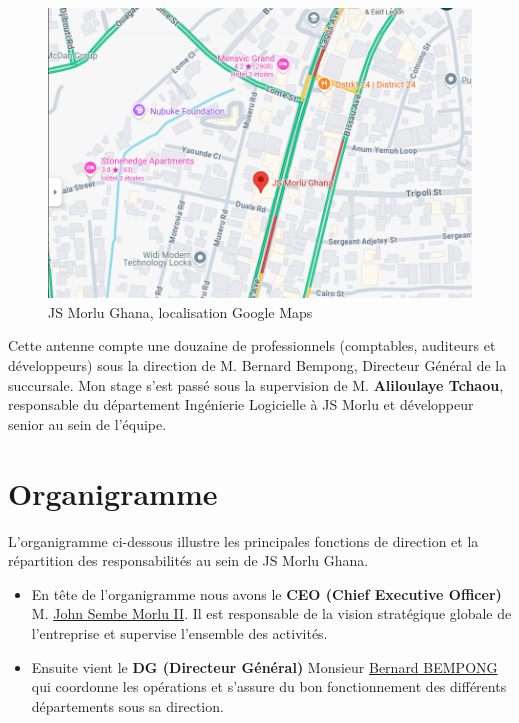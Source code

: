 {\begin{figure}[H]
\begin{center}
\includegraphics[width=15cm]{assets/presentation/jsmorlu-map.png}
\end{center}
\caption{JS Morlu Ghana, localisation Google Maps }
\end{figure}

\vspace{0.5cm}

Cette antenne compte une douzaine de professionnels (comptables, auditeurs et développeurs) sous la direction de M. Bernard Bempong, Directeur Général de la succursale. Mon stage s'est passé sous la supervision de M. \textbf{ Aliloulaye Tchaou}, responsable du département Ingénierie Logicielle à JS Morlu et développeur senior au sein de l'équipe.

\section{Organigramme}

L’organigramme ci-dessous illustre les principales fonctions de direction et la répartition des responsabilités au sein de JS Morlu Ghana.

\begin{itemize}
    \item En tête de l'organigramme nous avons le  \textbf{CEO (Chief Executive Officer)} M. \href{https://jsmorlu.com.gh/our-team/john-sembe-morlu-ii/}{John Sembe Morlu II}. Il est responsable de la vision stratégique globale de l’entreprise et supervise l’ensemble des activités.

    \item Ensuite vient le \textbf{DG (Directeur Général)} Monsieur \href{https://jsmorlu.com.gh/our-team/bernard-bempong/}{Bernard BEMPONG} qui coordonne les opérations et s’assure du bon fonctionnement des différents départements sous sa direction.


\end{itemize}}
